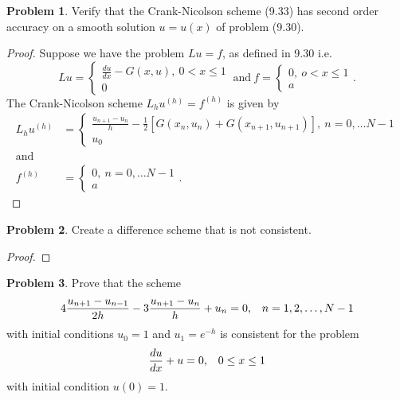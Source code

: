 \documentclass[12pt]{article}
\theoremstyle{definition}
\newtheorem{problem}{Problem}
\begin{document}
\begin{problem} Verify that the Crank-Nicolson scheme (9.33) has second order
  accuracy on a smooth solution $u=u(x)$ of problem (9.30).
\end{problem}

\begin{proof}
  Suppose we have the problem $Lu = f$, as defined in 9.30 i.e.
  \[
      Lu =
      \begin{cases}
        \frac{du}{dx} - G(x, u),\ 0 < x \leq 1 \\
        0
      \end{cases}
      \ \text{and} \
      f =
      \begin{cases}
        0,\ o < x \leq 1 \\
        a
      \end{cases}.
  \]
  The Crank-Nicolson scheme $L_hu^{(h)} = f^{(h)}$ is given by
  \begin{align*}
      L_hu^{(h)} &=
      \begin{cases}
        \frac{u_{n+1} - u_{n}}{h} - \frac{1}{2}[G(x_n, u_n) + G(x_{n+1}, u_{n+1})],\  n = 0, \dots N-1 \\
        u_0
      \end{cases}
      \\ \text{and} \\
      f^{(h)} &=
      \begin{cases}
        0,\  n = 0, \dots N-1 \\
        a
      \end{cases}.
  \end{align*}

\end{proof}


\begin{problem}
  Create a difference scheme that is not consistent.
\end{problem}

\begin{proof}
\end{proof}


\begin{problem}
  Prove that the scheme
  \[
    4 \frac{u_{n+1} - u_{n-1}}{2h} - 3 \frac{u_{n+1} - u_n}{h} + u_n = 0\text{,\quad $n = 1, 2, \dots, N-1$}
  \]
  with initial conditions $u_0 = 1$ and $u_1 = e^{-h}$ is consistent for the problem
  \[
    \frac{du}{dx} + u = 0\text{,\quad $0 \leq x \leq 1$}
  \]
  with initial condition $u(0) = 1$.
\end{problem}
\end{document}

